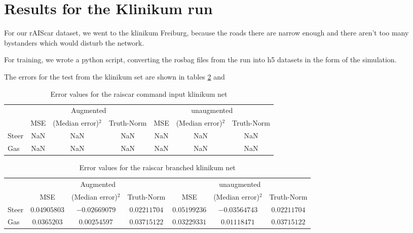 \documentclass[a4paper]{article}
\begin{document}
\newpage{}
\section{Results for the Klinikum run}
For our rAIScar dataset, we went to the klinikum Freiburg, because the roads
there are narrow enough and there aren't too many bystanders which would disturb
the network.

For training, we wrote a python script, converting the rosbag files from the run
into h5 datasets in the form of the simulation.

The errors for the test from the klinikum set are shown in tables \ref{tab:error_branched_aug_klinikum} and 

\begin{table}[H]
	\centering
	\caption{Error values for the raiscar command input klinikum net}
	\begin{tabular}{lccc|ccc}
		&\multicolumn{3}{c|}{Augmented} & \multicolumn{3}{c}{unaugmented} \\
		& MSE & (Median error)$^2$ & Truth-Norm & MSE & (Median error)$^2$ & Truth-Norm\\ \hline
		Steer & NaN & NaN & NaN & NaN & NaN & NaN \\
		Gas & NaN & NaN & NaN & NaN & NaN & NaN
	\end{tabular}
	\label{tab:error_command_aug}
\end{table}
\begin{table}[H]
	\centering
	\caption{Error values for the raiscar branched klinikum net}
	\begin{tabular}{lccc|ccc}
		&\multicolumn{3}{c|}{Augmented} & \multicolumn{3}{c}{unaugmented} \\
		& MSE & (Median error)$^2$ & Truth-Norm & MSE & (Median error)$^2$ & Truth-Norm\\ \hline
		Steer & $0.04905803$ & $-0.02669079$ & $0.02211704$ & $0.05199236$ & $-0.03564743$ & $0.02211704$ \\
		Gas & $0.0365203$ & $0.00254597$ & $0.03715122$ & $0.03229331$ & $0.01118471$ & $0.03715122$
	\end{tabular}
	\label{tab:error_branched_aug_klinikum}
\end{table}
\end{document}
